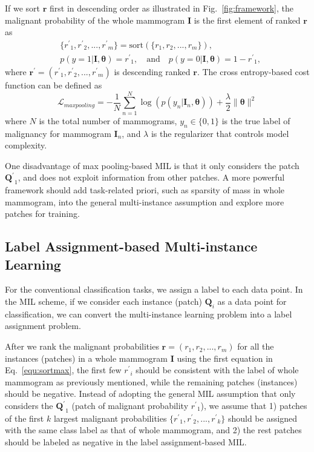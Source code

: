 \documentclass[runningheads,a4paper]{llncs}
\begin{document}
If we sort $\bm{r}$ first in descending order as illustrated in Fig.~\ref{fig:framework}, the malignant probability of the whole mammogram $\bm{I}$ is the first element of ranked $\bm{r}$ as
\begin{equation}
\label{equ:sortmax}
\begin{aligned}
&\{{r^\prime}_1, {r^\prime}_2, ..., {r^\prime}_m\} = \text{sort} (\{ r_1, r_2, ..., r_m\}), \\
&p(y=1|\bm{I}, \bm{\theta}) = {r^\prime}_1, \quad\text{and}\quad p(y=0|\bm{I}, \bm{\theta}) = 1-{r^\prime}_1,
\end{aligned}
\end{equation}
where $\bm{r}^\prime = ({r^\prime}_1, {r^\prime}_2, ..., {r^\prime}_m)$ is descending ranked $\bm{r}$. The cross entropy-based cost function can be defined as  %
\begin{equation}
\label{equ:maxloss}
\mathcal{L}_{maxpooling} = -\frac{1}{N}\sum_{n=1}^{N} \log(p(y_n | \bm{I}_n, \bm{\theta})) + \frac{\lambda}{2} \|\bm{\theta}\|^2
\end{equation}
where $N$ is the total number of mammograms, $y_n \in \{0,1\}$ is the true label of malignancy for mammogram $\bm{I}_n$, and $\lambda$ is the regularizer that controls model complexity.

One disadvantage of max pooling-based MIL is that it only considers the patch ${\bm{Q}^\prime}_1$, and does not exploit information from other patches. A more powerful framework should add task-related priori, such as sparsity of mass in whole mammogram, into the general multi-instance assumption and explore more patches for training. %
\subsection{Label Assignment-based Multi-instance Learning}\label{sec:labelassign}
For the conventional classification tasks, we assign a label to each data point. In the MIL scheme, if we consider each instance (patch) $\bm{Q}_i$ as a data point for classification, we can convert the multi-instance learning problem into a label assignment problem.

After we rank the malignant probabilities $\bm{r} = (r_{1}, r_{2}, ..., r_{m})$ for all the instances (patches) in a whole mammogram $\bm{I}$ using the first equation in Eq.~\ref{equ:sortmax}, the first few ${r^\prime}_i$ should be consistent with the label of whole mammogram as previously mentioned, while the remaining patches (instances) should be negative. Instead of adopting the general MIL assumption that only considers the ${\bm{Q}^\prime}_1$ (patch of malignant probability ${r^\prime}_1$), we assume that 1) patches of the first $k$ largest malignant probabilities $\{{r^\prime}_1, {r^\prime}_2, ..., {r^\prime}_k\}$ should be assigned with the same class label as that of whole mammogram, and 2) the rest patches should be labeled as negative in the label assignment-based MIL.
\end{document}
